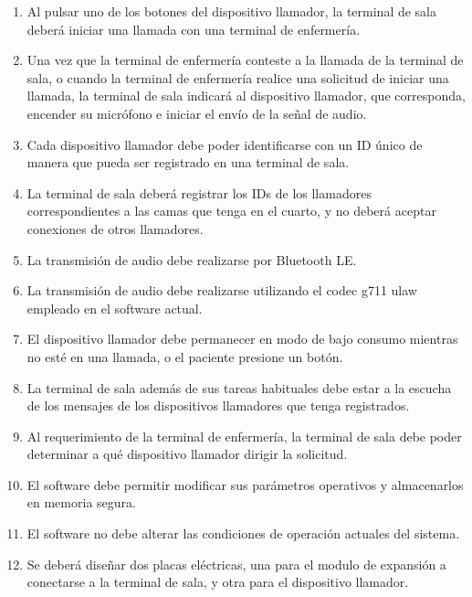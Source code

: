 \begin{enumerate}

\item Al pulsar uno de los botones del dispositivo llamador, la terminal de sala deberá iniciar una llamada con una terminal de enfermería.

\item Una vez que la terminal de enfermería conteste a la llamada de la terminal de sala, o cuando la terminal de enfermería realice una solicitud de iniciar una llamada, la terminal de sala indicará al dispositivo llamador, que corresponda, encender su micrófono e iniciar el envío de la señal de audio.

\item Cada dispositivo llamador debe poder identificarse con un ID único de manera que pueda ser registrado en una terminal de sala.

\item La terminal de sala deberá registrar los IDs de los llamadores correspondientes a las camas que tenga en el cuarto, y no deberá aceptar conexiones de otros llamadores.

\item La transmisión de audio debe realizarse por Bluetooth LE.

\item La transmisión de audio debe realizarse utilizando el codec g711 ulaw empleado en el software actual.

\item El dispositivo llamador debe permanecer en modo de bajo consumo mientras no esté en una llamada, o el paciente presione un botón.

\item La terminal de sala además de sus tareas habituales debe estar a la escucha de los mensajes de los dispositivos llamadores que tenga registrados.

\item Al requerimiento de la terminal de enfermería, la terminal de sala debe poder determinar a qué dispositivo llamador dirigir la solicitud.

\item El software debe permitir modificar sus parámetros operativos y almacenarlos en memoria segura.

\item El software no debe alterar las condiciones de operación actuales  del sistema.

\item Se deberá diseñar dos placas eléctricas, una para el modulo de expansión a conectarse a la terminal de sala, y otra para el dispositivo llamador.

\end{enumerate}

